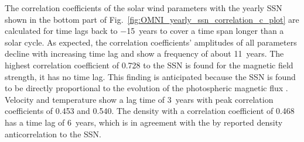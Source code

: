 The correlation coefficients of the solar wind parameters with the yearly SSN shown in the bottom part of Fig.~\ref{fig:OMNI_yearly_ssn_correlation_c_plot} are calculated for time lags back to \num{-15}~years to cover a time span longer than a solar cycle. As expected, the correlation coefficients' amplitudes of all parameters decline with increasing time lag and show a frequency of about 11~years. The highest correlation coefficient of 0.728 to the SSN is found for the magnetic field strength, it has no time lag. This finding is anticipated because the SSN is found to be directly proportional to the evolution of the photospheric magnetic flux \citep{Smith2003}.
Velocity and temperature show a lag time of 3~years with peak correlation coefficients of 0.453 and 0.540. The density with a correlation coefficient of 0.468 has a time lag of 6~years, which is in agreement with the by \citet{Bougeret1984} reported density anticorrelation to the SSN.	%

